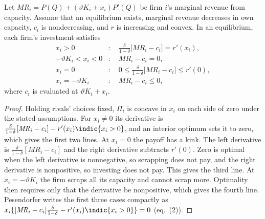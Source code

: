 \begin{proposition}\label{prop:11-pes-kt}
Let $\mathit{MR}_i = P(Q) + (\vartheta K_i + x_i)P'(Q)$ be firm $i$'s marginal revenue from capacity. Assume that an
equilibrium exists, marginal revenue decreases in own capacity, $c_i$ is nondecreasing, and $r$ is increasing and
convex. In an equilibrium, each firm's investment satisfies
\begin{equation}\label{eq:11-pes-kt}
\begin{aligned}
x_i > 0 &: \quad \frac{\delta}{1 - \delta}\big[\mathit{MR}_i - c_i\big] = r'(x_i),\\
-\vartheta K_i < x_i < 0 &: \quad \mathit{MR}_i - c_i = 0,\\
x_i = 0 &: \quad 0 \le \frac{\delta}{1 - \delta}\big[\mathit{MR}_i - c_i\big] \le r'(0),\\
x_i = -\vartheta K_i &: \quad \mathit{MR}_i - c_i \le 0,
\end{aligned}
\end{equation}
where $c_i$ is evaluated at $\vartheta K_i + x_i$.
\end{proposition}

\begin{proof}
Holding rivals' choices fixed, $\Pi_i$ is concave in $x_i$ on each side of zero under the stated assumptions. For
$x_i \neq 0$ its derivative is $\frac{\delta}{1-\delta}[\mathit{MR}_i - c_i] - r'(x_i)\indic\{x_i > 0\}$, and an
interior optimum sets it to zero, which gives the first two lines. At $x_i = 0$ the payoff has a kink. The left
derivative is $\frac{\delta}{1-\delta}[\mathit{MR}_i - c_i]$ and the right derivative subtracts $r'(0)$. Zero is
optimal when the left derivative is nonnegative, so scrapping does not pay, and the right derivative is nonpositive, so
investing does not pay. This gives the third line. At $x_i = -\vartheta K_i$ the firm scraps all its capacity and
cannot scrap more. Optimality then requires only that the derivative be nonpositive, which gives the fourth line.
Pesendorfer writes the first three cases compactly as
$x_i\{[\mathit{MR}_i - c_i]\frac{\delta}{1-\delta} - r'(x_i)\indic\{x_i > 0\}\} = 0$ (eq.~(2)).
\end{proof}

